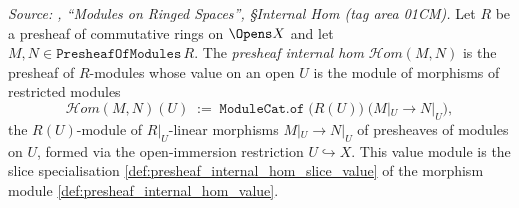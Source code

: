 \begin{definition}\leanok
  \label{def:presheaf_internal_hom}
  \textit{Source: \cite{stacks-project}, ``Modules on Ringed Spaces'', \S Internal Hom
  (tag area 01CM).}
  Let \(R\) be a presheaf of commutative rings on \(\Opens X\) and let
  \(M, N \in \mathtt{PresheafOfModules}\,R\). The \emph{presheaf internal hom}
  \(\mathcal{H}om(M, N)\) is the presheaf of \(R\)-modules whose value on an open
  \(U\) is the module of morphisms of restricted modules
  \[
    \mathcal{H}om(M, N)(U)
      \;:=\;
    \mathtt{ModuleCat.of}\;\bigl(R(U)\bigr)\;\bigl(M|_U \longrightarrow N|_U\bigr),
  \]
  the \(R(U)\)-module of \(R|_U\)-linear morphisms \(M|_U \to N|_U\) of presheaves of
  modules on \(U\), formed via the open-immersion restriction \(U \hookrightarrow X\).
  This value module is the slice specialisation
  \cref{def:presheaf_internal_hom_slice_value} of the morphism module
  \cref{def:presheaf_internal_hom_value}.


\end{definition}

